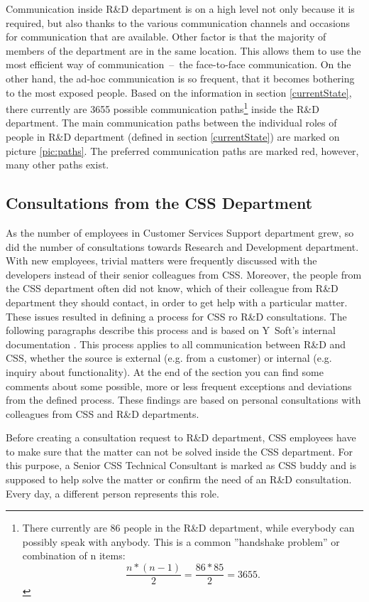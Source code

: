 \documentclass[11pt,singleside]{myfithesis2}
\begin{document}
Communication inside R\&D department is on a high level not only because it is required, but also thanks to the various communication channels and occasions for communication that are available. Other factor is that the majority of members of the department are in the same location. This allows them to use the most efficient way of communication~--~the face-to-face communication. On the other hand, the ad-hoc communication is so frequent, that it becomes bothering to the most exposed people. Based on the information in section \ref{currentState}, there currently are 3655 possible communication paths\footnote{There currently are 86 people in the R\&D department, while everybody can possibly speak with anybody. This is a common ''handshake problem'' or combination of n items:
\begin{equation}
	\frac{n*(n-1)}{2}=\frac{86*85}{2}=3655.
\end{equation} } inside the R\&D department. The main communication paths between the individual roles of people in R\&D department (defined in section \ref{currentState}) are marked on picture \ref{pic:paths}. The preferred communication paths are marked red, however, many other paths exist.

			
		\subsection{Consultations from the CSS Department}\label{cssConsult}
As the number of employees in Customer Services Support department grew, so did the number of consultations towards Research and Development department. With new employees, trivial matters were frequently discussed with the developers instead of their senior colleagues from CSS. Moreover, the people from the CSS department often did not know, which of their colleague from R\&D department they should contact, in order to get help with a particular matter. These issues resulted in defining a process for CSS ro R\&D consultations. The following paragraphs describe this process and is based on Y~Soft's internal documentation \cite{ysoftInternal}. This process applies to all communication between R\&D and CSS, whether the source is external (e.g. from a customer) or internal (e.g. inquiry about functionality). At the end of the section you can find some comments about some possible, more or less frequent exceptions and deviations from the defined process. These findings are based on personal consultations with colleagues from CSS and R\&D departments.

Before creating a consultation request to R\&D department, CSS employees have to make sure that the matter can not be solved inside the CSS department. For this purpose, a Senior CSS Technical Consultant is marked as CSS buddy and is supposed to help solve the matter or confirm the need of an R\&D consultation. Every day, a different person represents this role.
\end{document}
